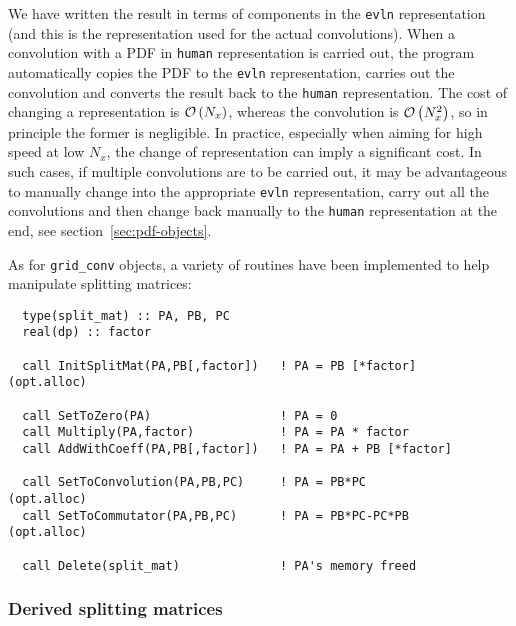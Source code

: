 \documentclass[12pt]{article}
\newcommand{\ttt}[1]{\texttt{#1}}
\newcommand{\order}[1]{{\cal O}\left(#1\right)}
\begin{document}
We have written the result in terms of components in the \ttt{evln}
representation (and this is the representation used for the actual
convolutions). When a convolution with a PDF in \ttt{human}
representation is carried out, the program automatically copies the
PDF to the \ttt{evln} representation, carries out the convolution and
converts the result back to the \ttt{human} representation.
%
The cost of changing a representation is $\order{N_x}$, whereas the
convolution is $\order{N^2_x}$, so in principle the former is
negligible. In practice, especially when aiming for high speed at low
$N_x$, the change of representation can imply a significant cost. In
such cases, if multiple convolutions are to be carried out, it may be
advantageous to manually change into the appropriate \ttt{evln}
representation, carry out all the convolutions and then change back
manually to
the \ttt{human}  representation at the end, see
section~\ref{sec:pdf-objects}.
%

As for \ttt{grid\_conv} objects, a variety of routines have been
implemented to help manipulate splitting matrices:
\begin{lstlisting}
  type(split_mat) :: PA, PB, PC
  real(dp) :: factor

  call InitSplitMat(PA,PB[,factor])   ! PA = PB [*factor]   (opt.alloc)

  call SetToZero(PA)                  ! PA = 0
  call Multiply(PA,factor)            ! PA = PA * factor               
  call AddWithCoeff(PA,PB[,factor])   ! PA = PA + PB [*factor]

  call SetToConvolution(PA,PB,PC)     ! PA = PB*PC          (opt.alloc)
  call SetToCommutator(PA,PB,PC)      ! PA = PB*PC-PC*PB    (opt.alloc)
  
  call Delete(split_mat)              ! PA's memory freed
\end{lstlisting}


\subsubsection{Derived splitting matrices}
\label{sec:derived-split-matrices}
\end{document}
